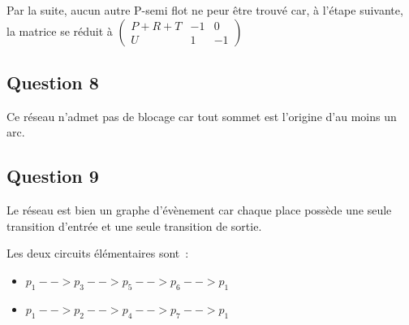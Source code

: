 Par la suite, aucun autre P-semi flot ne peur être trouvé car, à
l'étape suivante, la matrice se réduit à
$ \begin{pmatrix}
P+R+T&-1&0 \\
U&1&-1
\end{pmatrix}$
\subsection*{Question 8}
Ce réseau n'admet pas de blocage car tout sommet est l'origine d'au
moins un arc.
\subsection*{Question 9}
Le réseau est bien un graphe d'évènement car chaque place possède une
seule transition d'entrée et une seule transition de sortie.

Les deux circuits élémentaires sont~:
\begin{itemize}
\item $p_1 -->p_3 --> p_5 --> p_6 --> p_1$
\item $p_1 --> p_2 --> p_4 --> p_7 --> p_1$
\end{itemize}
